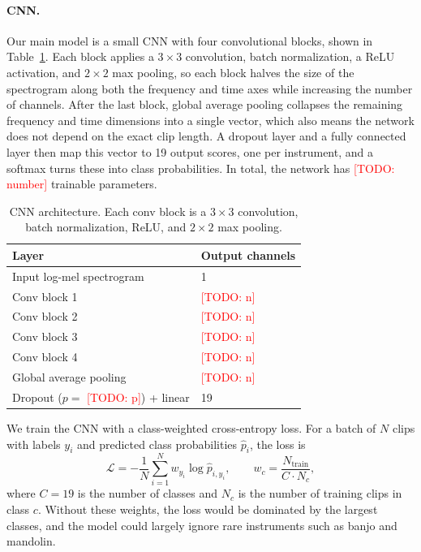 \documentclass[11pt]{article}
\newcommand{\todo}[1]{\textcolor{red}{[TODO: #1]}}
\begin{document}
\paragraph{CNN.} Our main model is a small CNN with four convolutional blocks, shown in Table~\ref{tab:cnn}. Each block applies a $3 \times 3$ convolution, batch normalization, a ReLU activation, and $2 \times 2$ max pooling, so each block halves the size of the spectrogram along both the frequency and time axes while increasing the number of channels. After the last block, global average pooling collapses the remaining frequency and time dimensions into a single vector, which also means the network does not depend on the exact clip length. A dropout layer and a fully connected layer then map this vector to 19 output scores, one per instrument, and a softmax turns these into class probabilities. In total, the network has \todo{number} trainable parameters.

\begin{table}[t]
  \centering
  \small
  \begin{tabular}{ll}
    \hline
    \textbf{Layer} & \textbf{Output channels} \\
    \hline
    Input log-mel spectrogram & 1 \\
    Conv block 1 & \todo{n} \\
    Conv block 2 & \todo{n} \\
    Conv block 3 & \todo{n} \\
    Conv block 4 & \todo{n} \\
    Global average pooling & \todo{n} \\
    Dropout ($p = $ \todo{p}) + linear & 19 \\
    \hline
  \end{tabular}
  \caption{\label{tab:cnn}
    CNN architecture. Each conv block is a $3 \times 3$ convolution, batch normalization, ReLU, and $2 \times 2$ max pooling.
  }
\end{table}

We train the CNN with a class-weighted cross-entropy loss. For a batch of $N$ clips with labels $y_i$ and predicted class probabilities $\hat{p}_i$, the loss is
\begin{equation}
  \mathcal{L} = -\frac{1}{N} \sum_{i=1}^{N} w_{y_i} \log \hat{p}_{i, y_i},
  \qquad
  w_c = \frac{N_{\text{train}}}{C \cdot N_c},
\end{equation}
where $C = 19$ is the number of classes and $N_c$ is the number of training clips in class $c$. Without these weights, the loss would be dominated by the largest classes, and the model could largely ignore rare instruments such as banjo and mandolin.
\end{document}
